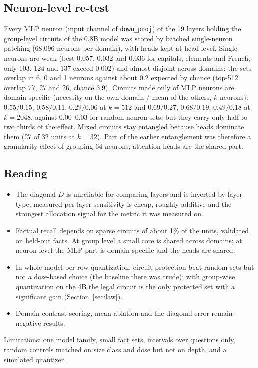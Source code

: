 \documentclass[11pt]{article}
\newcommand{\code}[1]{\texttt{#1}}
\begin{document}
\subsection{Neuron-level re-test}
Every MLP neuron (input channel of \code{down\_proj}) of the 19 layers holding the group-level circuits of the 0.8B model was scored by batched single-neuron patching (68{,}096 neurons per domain), with heads kept at head level.
Single neurons are weak (best 0.057, 0.032 and 0.036 for capitals, elements and French; only 103, 124 and 137 exceed 0.002) and almost disjoint across domains: the sets overlap in 6, 0 and 1 neurons against about 0.2 expected by chance (top-512
overlap 77, 27 and 26, chance 3.9). Circuits made only of MLP neurons are domain-specific (necessity on the own domain / mean of the others, $k$ neurons): $0.55/0.15$, $0.58/0.11$, $0.29/0.06$ at $k=512$ and $0.69/0.27$, $0.68/0.19$, $0.49/0.18$ at $k=2048$,
against $0.00$--$0.03$ for random neuron sets, but they carry only half to two thirds of the effect. Mixed circuits stay entangled because heads dominate them (27 of 32 units at $k=32$). Part of the earlier entanglement was therefore a granularity
effect of grouping 64 neurons; attention heads are the shared part.

\subsection{Reading}
\begin{itemize}\setlength\itemsep{0pt}
\item The diagonal $D$ is unreliable for comparing layers and is inverted by layer type; measured per-layer sensitivity is cheap, roughly additive and the strongest allocation signal for the metric it was measured on.
\item Factual recall depends on sparse circuits of about 1\% of the units, validated on held-out facts. At group level a small core is shared across domains; at neuron level the MLP part is domain-specific and the heads are shared.
\item In whole-model per-row quantization, circuit protection beat random sets but not a dose-based choice (the baseline there was crude); with group-wise quantization on the 4B the legal circuit is the only protected set with a significant gain (Section~\ref{sec:law}).
\item Domain-contrast scoring, mean ablation and the diagonal error remain negative results.
\end{itemize}
Limitations: one model family, small fact sets, intervals over questions only, random controls matched on size class and dose but not on depth, and a simulated quantizer.
\end{document}
